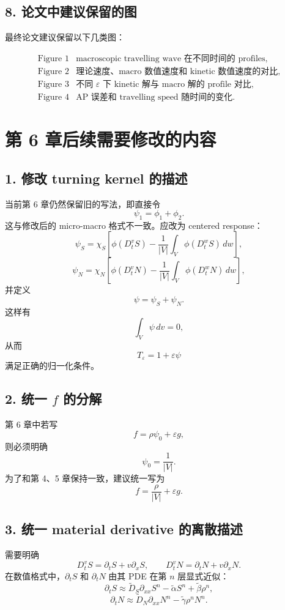 \subsection*{8. 论文中建议保留的图}

最终论文建议保留以下几类图：

\[
\begin{array}{ll}
\text{Figure 1} & \text{macroscopic travelling wave 在不同时间的 profiles},\\
\text{Figure 2} & \text{理论速度、macro 数值速度和 kinetic 数值速度的对比},\\
\text{Figure 3} & \text{不同 } \varepsilon \text{ 下 kinetic 解与 macro 解的 profile 对比},\\
\text{Figure 4} & \text{AP 误差和 travelling speed 随时间的变化}.
\end{array}
\]

\section*{第 6 章后续需要修改的内容}

\subsection*{1. 修改 turning kernel 的描述}

当前第 6 章仍然保留旧的写法，即直接令
\[
\psi_1=\phi_1+\phi_2.
\]
这与修改后的 micro-macro 格式不一致。应改为 centered response：
\[
\psi_S
=
\chi_S\left[
\phi(D_t^v S)
-
\frac{1}{|V|}\int_V \phi(D_t^w S)\,dw
\right],
\]
\[
\psi_N
=
\chi_N\left[
\phi(D_t^v N)
-
\frac{1}{|V|}\int_V \phi(D_t^w N)\,dw
\right],
\]
并定义
\[
\psi=\psi_S+\psi_N.
\]
这样有
\[
\int_V \psi\,dv=0,
\]
从而
\[
T_\varepsilon=1+\varepsilon\psi
\]
满足正确的归一化条件。

\subsection*{2. 统一 \(f\) 的分解}

第 6 章中若写
\[
f=\rho\psi_0+\varepsilon g,
\]
则必须明确
\[
\psi_0=\frac{1}{|V|}.
\]
为了和第 4、5 章保持一致，建议统一写为
\[
f=\frac{\rho}{|V|}+\varepsilon g.
\]

\subsection*{3. 统一 material derivative 的离散描述}

需要明确
\[
D_t^v S=\partial_t S+v\partial_xS,
\qquad
D_t^v N=\partial_t N+v\partial_xN.
\]
在数值格式中，\(\partial_t S\) 和 \(\partial_t N\) 由其 PDE 在第 \(n\) 层显式近似：
\[
\partial_t S
\approx
\widetilde D_S\partial_{xx}S^n-\widetilde\alpha S^n+\widetilde\beta\rho^n,
\]
\[
\partial_t N
\approx
\widetilde D_N\partial_{xx}N^n-\widetilde\gamma\rho^nN^n.
\]

